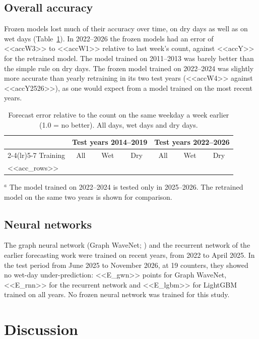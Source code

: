 \documentclass[preprint,12pt,authoryear]{elsarticle}
\begin{document}
\subsection{Overall accuracy}

Frozen models lost much of their accuracy over time, on dry days as well as on wet days (Table~\ref{tab:acc}). In 2022--2026 the frozen models had an error of <<accW3>> to <<accW1>> relative to last week's count, against <<accY>> for the retrained model. The model trained on 2011--2013 was barely better than the simple rule on dry days. The frozen model trained on 2022--2024 was slightly more accurate than yearly retraining in its two test years (<<accW4>> against <<accY2526>>), as one would expect from a model trained on the most recent years.

\begin{table}[!htbp]
\centering
\caption{Forecast error relative to the count on the same weekday a week earlier (1.0 = no better). All days, wet days and dry days.}
\label{tab:acc}
\footnotesize
\setlength{\tabcolsep}{4pt}
\begin{tabular}{@{}lcccccc@{}}
\toprule
 & \multicolumn{3}{c}{Test years 2014--2019} & \multicolumn{3}{c}{Test years 2022--2026} \\
\cmidrule(lr){2-4}\cmidrule(lr){5-7}
Training & All & Wet & Dry & All & Wet & Dry \\
\midrule
<<acc_rows>>
\bottomrule
\end{tabular}

\smallskip
\footnotesize $^{a}$ The model trained on 2022--2024 is tested only in 2025--2026. The retrained model on the same two years is shown for comparison.
\end{table}

\subsection{Neural networks}

The graph neural network (Graph WaveNet; \citealp{wu2019graph}) and the recurrent network of the earlier forecasting work were trained on recent years, from 2022 to April 2025. In the test period from June 2025 to November 2026, at 19 counters, they showed no wet-day under-prediction: <<E_gwn>> points for Graph WaveNet, <<E_rnn>> for the recurrent network and <<E_lgbm>> for LightGBM trained on all years. No frozen neural network was trained for this study.

\section{Discussion}
\end{document}
